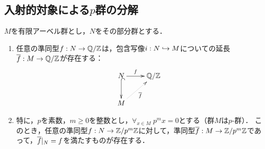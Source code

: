 \documentclass[uplatex,dvipdfmx]{jsreport}
\begin{document}
\subsection{入射的対象による$p$群の分解}

\begin{lemma}[$p$-群の分解]\label{lemma-decomposition-of-p-group}
    $M$を有限アーベル群とし，$N$をその部分群とする．
    \begin{enumerate}
        \item 任意の準同型$f:N\to\mathbb{Q}/\mathbb{Z}$は，包含写像$i:N\hookrightarrow M$についての延長$\overline{f}:M\to\mathbb{Q}/\mathbb{Z}$が存在する：
        \[\xymatrix{
            N\ar[r]^-f \ar@{^{(}->}[d]&\Q/\Z\\
            M\ar@{.>}[ur]_-{\o{f}}
        }\]
        \item 特に，$p$を素数，$m\ge 0$を整数とし，$\forall_{x\in M}\;p^mx=0$とする（群$M$は$p$-群）．
        このとき，任意の準同型$f:N\to\mathbb{Z}/p^m\mathbb{Z}$に対して，準同型$\overline{f}:M\to\mathbb{Z}/p^m\mathbb{Z}$であって，$\overline{f}|_N=f$を満たすものが存在する．
    \end{enumerate}
\end{lemma}
\end{document}
